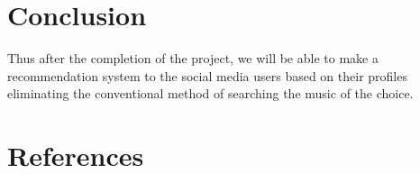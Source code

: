 \documentclass{article}
\begin{document}
\section{Conclusion}
\cleardoublepage
Thus after the completion of the project, we will be able to make a recommendation system to the social media users based on their profiles eliminating the conventional method of searching the music of the choice.
\section*{References}


\nocite{*}
\end{document}

